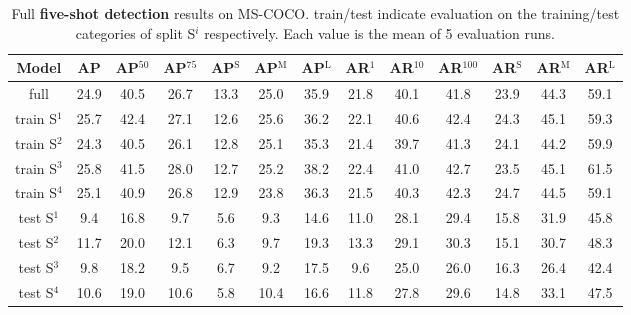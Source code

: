 \documentclass{article}
\newcommand{\coco}{MS-COCO\xspace}
\begin{document}
\begin{table}[h]
\begin{center}
\begin{small}
\begin{tabular}{c|ccc|ccc|ccc|ccc}
Model & AP & AP$^{50}$ & AP$^{75}$ & AP$^\text{S}$ & AP$^\text{M}$ & AP$^\text{L}$ & AR$^{1}$ & AR$^{10}$ & AR$^{100}$ & AR$^\text{S}$ & AR$^\text{M}$ & AR$^\text{L}$\\
\hline
full & 24.9 & 40.5 & 26.7 & 13.3 & 25.0 & 35.9 & 21.8 & 40.1 & 41.8 & 23.9 & 44.3 & 59.1 \\
\hline
train S$^1$ & 25.7 & 42.4 & 27.1 & 12.6 & 25.6 & 36.2 & 22.1 & 40.6 & 42.4 & 24.3 & 45.1 & 59.3 \\
train S$^2$ & 24.3 & 40.5 & 26.1 & 12.8 & 25.1 & 35.3 & 21.4 & 39.7 & 41.3 & 24.1 & 44.2 & 59.9 \\
train S$^3$ & 25.8 & 41.5 & 28.0 & 12.7 & 25.2 & 38.2 & 22.4 & 41.0 & 42.7 & 23.5 & 45.1 & 61.5 \\
train S$^4$ & 25.1 & 40.9 & 26.8 & 12.9 & 23.8 & 36.3 & 21.5 & 40.3 & 42.3 & 24.7 & 44.5 & 59.1 \\
\hline
test S$^1$ & 9.4 & 16.8 & 9.7 & 5.6 & 9.3 & 14.6 & 11.0 & 28.1 & 29.4 & 15.8 & 31.9 & 45.8 \\
test S$^2$ & 11.7 & 20.0 & 12.1 & 6.3 & 9.7 & 19.3 & 13.3 & 29.1 & 30.3 & 15.1 & 30.7 & 48.3 \\
test S$^3$ & 9.8 & 18.2 & 9.5 & 6.7 & 9.2 & 17.5 & 9.6 & 25.0 & 26.0 & 16.3 & 26.4 & 42.4 \\
test S$^4$ & 10.6 & 19.0 & 10.6 & 5.8 & 10.4 & 16.6 & 11.8 & 27.8 & 29.6 & 14.8 & 33.1 & 47.5
\end{tabular}
\end{small}
\end{center}
\caption{Full \textbf{five-shot detection} results on \coco. train/test indicate evaluation on the training/test categories of split S$^i$ respectively. Each value is the mean of 5 evaluation runs.}
\vspace{-12pt}
\label{table:extended_five-shot_detection_results}
\end{table}
\end{document}

